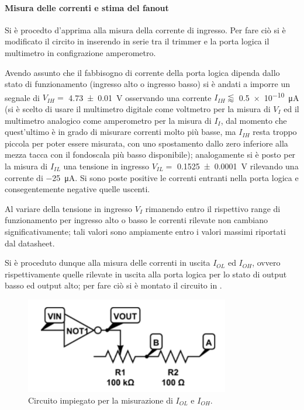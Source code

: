 \paragraph{Misura delle correnti e stima del fanout}
	Si è procedto d'apprima alla misura della corrente di ingresso.
	Per fare ciò si è modificato il circito in  inserendo in serie tra il trimmer e la porta logica il multimetro in configrazione amperometro.

	Avendo assunto che il fabbisogno di corrente della porta logica dipenda 	dallo stato di funzionamento (ingresso alto o ingresso basso)
	si è andati a imporre un segnale di $V_{IH} =$ \SI{4.73\pm 0.01}{\volt} osservando una corrente $I_{IH} \lessapprox$ \SI{0.5e-10}{\micro \ampere} (si è scelto di usare il multimetro digitale come voltmetro per la misura di $V_I$ ed il multimetro analogico come amperometro per la misura di $I_I$, dal momento che quest'ultimo è in grado di misurare correnti molto più basse, ma $I_{IH}$ resta troppo piccola per poter essere misurata, con uno spostamento dallo zero inferiore alla mezza tacca con il fondoscala più basso disponibile);
	analogamente si è posto per la misura di  $I_{IL}$ una tensione in ingresso $V_{IL} =$ \SI{0.1525(1)}{\volt} rilevando una corrente di \SI{-25}{\micro \ampere}. Si sono poste positive le correnti entranti nella porta logica e consegentemente negative quelle uscenti.

	Al variare della tensione in ingresso $V_{I}$ rimanendo entro il rispettivo range di funzionamento per ingresso alto o basso le correnti rilevate non cambiano significativamente; tali valori sono ampiamente entro i valori massimi riportati dal datasheet.

	Si è proceduto dunque alla misura delle correnti in uscita $I_{OL}$ ed $I_{OH}$, ovvero rispettivamente quelle rilevate in uscita alla porta logica per lo stato di output basso ed output alto; per fare ciò si è montato il circuito in .

	\begin{figure}[h]
		\centering
		\includegraphics[scale=0.75]{cir2.png}
		\caption{Circuito impiegato per la misurazione di $I_{OL}$ e $I_{OH}$. }
		\label{f:c2}
	\end{figure}

